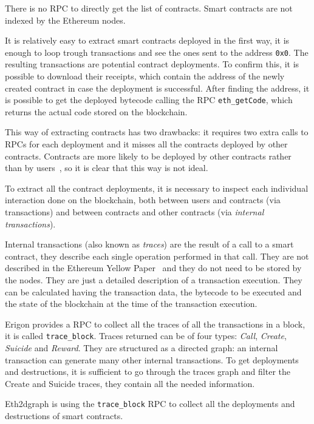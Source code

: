 There is no RPC to directly get the list of contracts. Smart contracts are not indexed by the Ethereum nodes.

It is relatively easy to extract smart contracts deployed in the first way, it is enough to loop trough transactions and see the ones sent to the address \texttt{0x0}. The resulting transactions are potential contract deployments. To confirm this, it is possible to download their receipts, which contain the address of the newly created contract in case the deployment is successful. After finding the address, it is possible to get the deployed bytecode calling the RPC \texttt{eth\_getCode}, which returns the actual code stored on the blockchain.

This way of extracting contracts has two drawbacks: it requires two extra calls to RPCs for each deployment and it misses all the contracts deployed by other contracts. Contracts are more likely to be deployed by other contracts rather than by users~\cite{ethereum-sc-topology}, so it is clear that this way is not ideal.

To extract all the contract deployments, it is necessary to inspect each individual interaction done on the blockchain, both between users and contracts (via transactions) and between contracts and other contracts (via \textit{internal transactions}). 

Internal transactions (also known as \textit{traces}) are the result of a call to a smart contract, they describe each single operation performed in that call. They are not described in the Ethereum Yellow Paper~\cite{ethereum-yellow} and they do not need to be stored by the nodes. They are just a detailed description of a transaction execution. They can be calculated having the transaction data, the bytecode to be executed and the state of the blockchain at the time of the transaction execution. 

Erigon provides a RPC to collect all the traces of all the transactions in a block, it is called \texttt{trace\_block}. Traces returned can be of four types: \textit{Call}, \textit{Create}, \textit{Suicide} and \textit{Reward}. They are structured as a directed graph: an internal transaction can generate many other internal transactions. To get deployments and destructions, it is sufficient to go through the traces graph and filter the Create and Suicide traces, they contain all the needed information.

Eth2dgraph is using the \texttt{trace\_block} RPC to collect all the deployments and destructions of smart contracts.

